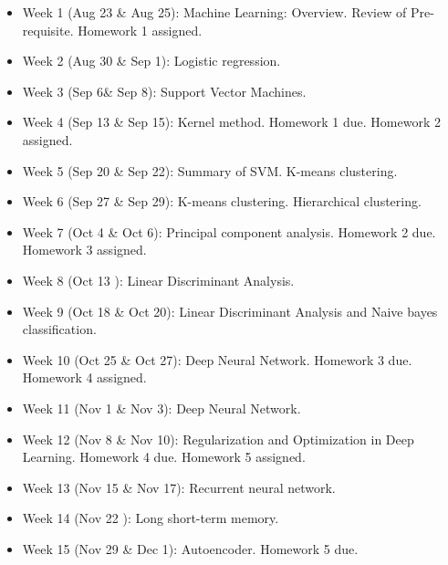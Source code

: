 \documentclass[a4paper,10pt]{article}
\begin{document}
\begin{itemize}

\item Week 1 (Aug 23 \& Aug 25): Machine Learning: Overview.  Review of Pre-requisite. Homework 1 assigned. 

\item Week 2 (Aug 30 \& Sep 1): Logistic regression. 

\item Week 3 (Sep 6\& Sep 8):  Support Vector Machines. 

\item Week 4 (Sep 13 \& Sep 15): Kernel method. Homework 1 due. Homework 2 assigned.

\item Week 5 (Sep 20 \& Sep 22): Summary of SVM. K-means clustering. 

\item Week 6 (Sep 27 \& Sep 29): K-means clustering. Hierarchical clustering. 

\item Week 7 (Oct 4 \& Oct 6): Principal component analysis. Homework 2 due. Homework 3 assigned.

\item Week 8 (Oct 13 ):  Linear Discriminant Analysis. 

\item Week 9 (Oct 18 \& Oct 20):  Linear Discriminant Analysis and Naive bayes classification. 

\item Week 10 (Oct 25 \& Oct 27):  Deep Neural Network.  Homework 3 due. Homework 4 assigned.

\item Week 11 (Nov 1 \& Nov 3):   Deep Neural Network. 

\item Week 12 (Nov 8 \& Nov 10): Regularization and Optimization in Deep Learning.  Homework 4 due. Homework 5 assigned. 

\item Week 13 (Nov 15 \& Nov 17):  Recurrent neural network.

\item Week 14 (Nov 22 ): Long short-term memory.

\item Week 15 (Nov 29 \& Dec 1): Autoencoder. Homework 5 due. 
 
\end{itemize}
\end{document}
